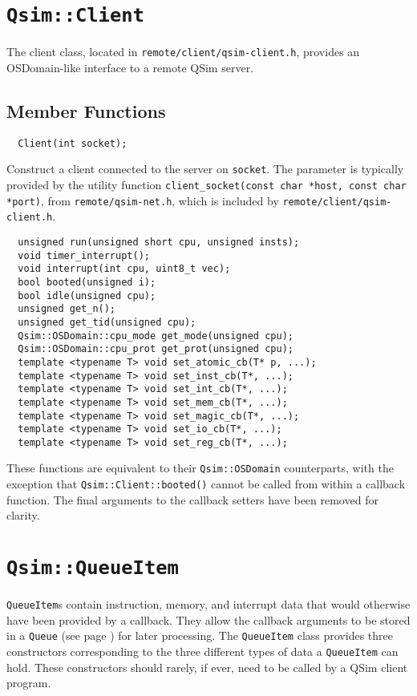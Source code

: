 \documentclass[letterpaper, 10pt]{book}
\begin{document}
\section{\texttt{Qsim::Client}} \label{class:Client}
The client class, located in \texttt{remote/client/qsim-client.h}, provides an
OSDomain-like interface to a remote QSim server.

\subsection{Member Functions}

\label{func:Client}
\begin{verbatim}
  Client(int socket);
\end{verbatim}
Construct a client connected to the server on \texttt{socket}. The parameter is
typically provided by the utility function
\texttt{client\_socket(const char *host, const char *port)}, from
\texttt{remote/qsim-net.h}, which is included by
\texttt{remote/client/qsim-client.h}.

\begin{verbatim}
  unsigned run(unsigned short cpu, unsigned insts);
  void timer_interrupt();
  void interrupt(int cpu, uint8_t vec);
  bool booted(unsigned i);
  bool idle(unsigned cpu);
  unsigned get_n();
  unsigned get_tid(unsigned cpu);
  Qsim::OSDomain::cpu_mode get_mode(unsigned cpu);
  Qsim::OSDomain::cpu_prot get_prot(unsigned cpu);
  template <typename T> void set_atomic_cb(T* p, ...);
  template <typename T> void set_inst_cb(T*, ...);
  template <typename T> void set_int_cb(T*, ...);
  template <typename T> void set_mem_cb(T*, ...);
  template <typename T> void set_magic_cb(T*, ...);
  template <typename T> void set_io_cb(T*, ...);
  template <typename T> void set_reg_cb(T*, ...);

\end{verbatim}
These functions are equivalent to their \texttt{Qsim::OSDomain} counterparts,
with the exception that \texttt{Qsim::Client::booted()} cannot be called from
within a callback function. The final arguments to the callback setters have
been removed for clarity.

\newpage

\section{\texttt{Qsim::QueueItem}} \label{struct:QueueItem}
\texttt{QueueItem}s contain instruction, memory, and interrupt data that would
otherwise have been provided by a callback. They allow the callback arguments
to be stored in a \texttt{Queue} (see page \pageref{class:Queue}) for later
processing. The \texttt{QueueItem} class provides three constructors
corresponding to the three different types of data a \texttt{QueueItem} can
hold. These constructors should rarely, if ever, need to be called by a QSim
client program.
\end{document}
